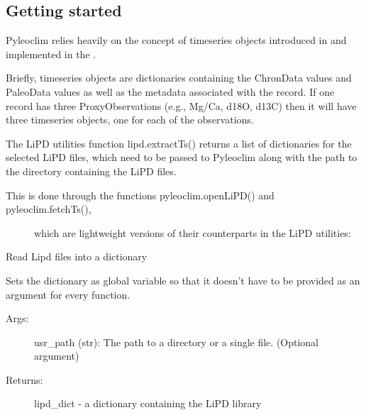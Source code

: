 \documentclass[letterpaper,10pt,english]{sphinxmanual}
\begin{document}
\subsection{Getting started}
\label{\detokenize{Main:getting-started}}
Pyleoclim relies heavily on the concept of timeseries objects introduced in
 and implemented in the
.

Briefly, timeseries objects are dictionaries containing the ChronData values and
PaleoData values as well as the metadata associated with the record. If one record
has three ProxyObservations (e.g., Mg/Ca, d18O, d13C) then it will have three timeseries
objects, one for each of the observations.

The LiPD utilities function lipd.extractTs() returns a list of dictionaries for
the selected LiPD files, which need to be passed to Pyleoclim along with the path
to the directory containing the LiPD files.
\begin{description}
\item[{This is done through the functions pyleoclim.openLiPD() and pyleoclim.fetchTs(),}] \leavevmode
which are lightweight versions of their counterparts in the LiPD utilities:

\end{description}

\begin{fulllineitems}
\label{\detokenize{Main:pyleoclim.openLipd}}
Read Lipd files into a dictionary

Sets the dictionary as global variable so that it doesn’t have to be provided
as an argument for every function.
\begin{description}
\item[{Args:}] \leavevmode
usr\_path (str): The path to a directory or a single file. (Optional argument)

\item[{Returns:}] \leavevmode
lipd\_dict - a dictionary containing the LiPD library

\end{description}

\end{fulllineitems}
\end{document}
